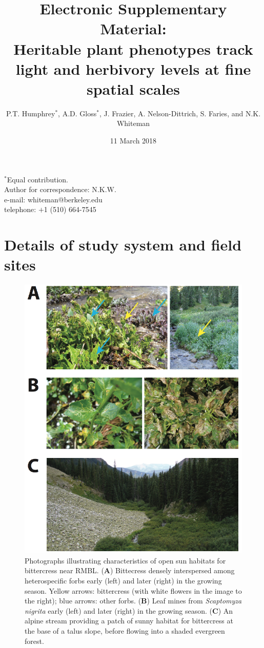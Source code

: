 \documentclass[11pt, oneside]{amsart}
\title{%
Electronic Supplementary Material:\\
\vspace{0.5cm}
\small Heritable plant phenotypes track light and herbivory levels at fine spatial scales
}
\author{P.T. Humphrey$^{*}$, A.D. Gloss$^{*}$, J. Frazier, A. Nelson-Dittrich, S. Faries, and N.K. Whiteman}
\date{11 March 2018}
\newcommand\tab[1][0.75cm]{\hspace*{#1}}
\let\oldtableofcontents\tableofcontents
\renewcommand{\tableofcontents}{%
  \vspace*{-\linespacing}%
  \oldtableofcontents}
\begin{document}
\maketitle

\tableofcontents

\vspace{0.5cm}
$^*$Equal contribution.\\
Author for correspondence: N.K.W.\\
\tab e-mail: whiteman@berkeley.edu\\
\tab telephone: $+$1 (510) 664-7545

\newpage

\section{Details of study system and field sites}

\begin{figure}[!htbp]
\centering
\includegraphics[scale=0.75]{system}
\caption{Photographs illustrating characteristics of open sun habitats for bittercress near RMBL. (\textbf{A}) Bittecress densely interspersed among heterospecific forbs early (left) and later (right) in the growing season. Yellow arrows: bittercress (with white flowers in the image to the right); blue arrows: other forbs. (\textbf{B}) Leaf mines from \emph{Scaptomyza nigrita} early (left) and later (right) in the growing season. (\textbf{C}) An alpine stream providing a patch of sunny habitat for bittercress at the base of a talus slope, before flowing into a shaded evergreen forest.}
\label{system}
\end{figure}
\end{document}

